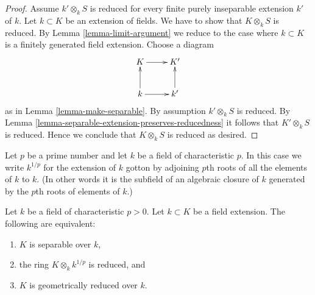 \begin{proof}
Assume $k' \otimes_k S$ is reduced for every finite
purely inseparable extension $k'$ of $k$. Let $k \subset K$ be
an extension of fields. We have to show that $K \otimes_k S$
is reduced. By Lemma \ref{lemma-limit-argument} we reduce to the case where
$k \subset K$ is a finitely generated field extension. Choose a diagram
$$
\xymatrix{
K \ar[r] & K' \\
k \ar[u] \ar[r] & k' \ar[u]
}
$$
as in Lemma \ref{lemma-make-separable}. By assumption $k' \otimes_k S$
is reduced. By Lemma \ref{lemma-separable-extension-preserves-reducedness}
it follows that $K' \otimes_k S$ is reduced.
Hence we conclude that $K \otimes_k S$ is reduced as desired.
\end{proof}

\noindent
Let $p$ be a prime number and let $k$ be a field of characteristic $p$.
In this case we write $k^{1/p}$ for the extension of $k$ gotton by
adjoining $p$th roots of all the elements of $k$ to $k$.
(In other words it is the subfield of an algebraic closure of
$k$ generated by the $p$th roots of elements of $k$.)

\begin{lemma}
\label{lemma-characterize-separable-field-extensions}
Let $k$ be a field of characteristic $p > 0$.
Let $k \subset K$ be a field extension.
The following are equivalent:
\begin{enumerate}
\item $K$ is separable over $k$,
\item the ring $K \otimes_k k^{1/p}$ is reduced, and
\item $K$ is geometrically reduced over $k$.
\end{enumerate}
\end{lemma}


